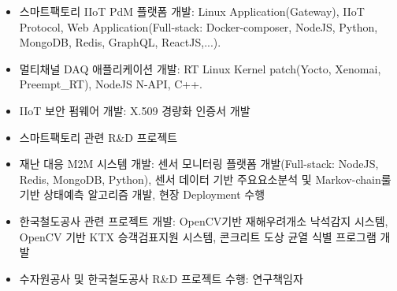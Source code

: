 \documentclass[10pt,a4paper,ragged2e]{altacv}
\begin{document}

\begin{fullwidth}
\makecvheader
\end{fullwidth}



\begin{itemize}
\item 스마트팩토리 IIoT PdM 플랫폼 개발: Linux Application(Gateway), IIoT Protocol, Web Application(Full-stack: Docker-composer, NodeJS, Python, MongoDB, Redis, GraphQL, ReactJS,...).
\item 멀티채널 DAQ 애플리케이션 개발: RT Linux Kernel patch(Yocto, Xenomai, Preempt\_RT), NodeJS N-API, C++.
\item IIoT 보안 펌웨어 개발: X.509 경량화 인증서 개발 
\item 스마트팩토리 관련 R\&D 프로젝트
\end{itemize}

\divider

\begin{itemize}
\item 재난 대응 M2M 시스템 개발: 센서 모니터링 플랫폼 개발(Full-stack: NodeJS, Redis, MongoDB, Python), 센서 데이터 기반 주요요소분석 및 Markov-chain룰 기반 상태예측 알고리즘 개발, 현장 Deployment 수행
\item 한국철도공사 관련 프로젝트 개발: OpenCV기반 재해우려개소 낙석감지 시스템, OpenCV 기반 KTX 승객검표지원 시스템, 콘크리트 도상 균열 식별 프로그램 개발
\item 수자원공사 및 한국철도공사 R\&D 프로젝트 수행: 연구책임자
\end{itemize}
\end{document}
